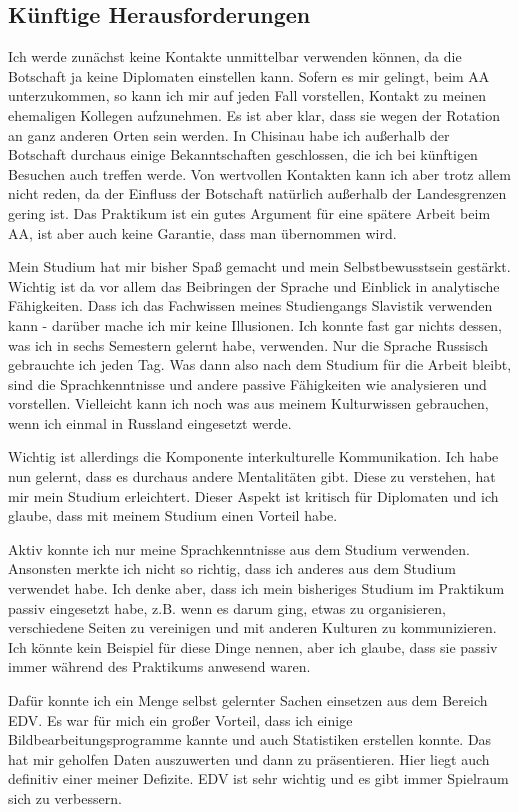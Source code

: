 \documentclass{../../sem_paper}
\begin{document}
\subsection{Künftige Herausforderungen}
Ich werde zunächst keine Kontakte unmittelbar verwenden können, da die Botschaft ja keine Diplomaten einstellen kann. Sofern es mir gelingt, beim AA unterzukommen, so kann ich mir auf jeden Fall vorstellen, Kontakt zu meinen ehemaligen Kollegen aufzunehmen. Es ist aber klar, dass sie wegen der Rotation an ganz anderen Orten sein werden. In Chisinau habe ich außerhalb der Botschaft durchaus einige Bekanntschaften geschlossen, die ich bei künftigen Besuchen auch treffen werde. Von wertvollen Kontakten kann ich aber trotz allem nicht reden, da der Einfluss der Botschaft natürlich außerhalb der Landesgrenzen gering ist. Das Praktikum ist ein gutes Argument für eine spätere Arbeit beim AA, ist aber auch keine Garantie, dass man übernommen wird.

Mein Studium hat mir bisher Spaß gemacht und mein Selbstbewusstsein gestärkt. Wichtig ist da vor allem das Beibringen der Sprache und Einblick in analytische Fähigkeiten. Dass ich das Fachwissen meines Studiengangs Slavistik verwenden kann - darüber mache ich mir keine Illusionen. Ich konnte fast gar nichts dessen, was ich in sechs Semestern gelernt habe, verwenden. Nur die Sprache Russisch gebrauchte ich jeden Tag. Was dann also nach dem Studium für die Arbeit bleibt, sind die Sprachkenntnisse und andere passive Fähigkeiten wie analysieren und vorstellen. Vielleicht kann ich noch was aus meinem Kulturwissen gebrauchen, wenn ich einmal in Russland eingesetzt werde.

Wichtig ist allerdings die Komponente interkulturelle Kommunikation. Ich habe nun gelernt, dass es durchaus andere Mentalitäten gibt. Diese zu verstehen, hat mir mein Studium erleichtert. Dieser Aspekt ist kritisch für Diplomaten und ich glaube, dass mit meinem Studium einen Vorteil habe.

Aktiv konnte ich nur meine Sprachkenntnisse aus dem Studium verwenden. Ansonsten merkte ich nicht so richtig, dass ich anderes aus dem Studium verwendet habe. Ich denke aber, dass ich mein bisheriges Studium im Praktikum passiv eingesetzt habe, z.B. wenn es darum ging, etwas zu organisieren, verschiedene Seiten zu vereinigen und mit anderen Kulturen zu kommunizieren. Ich könnte kein Beispiel für diese Dinge nennen, aber ich glaube, dass sie passiv immer während des Praktikums anwesend waren.

Dafür konnte ich ein Menge selbst gelernter Sachen einsetzen aus dem Bereich EDV. Es war für mich ein großer Vorteil, dass ich einige Bildbearbeitungsprogramme kannte und auch Statistiken erstellen konnte. Das hat mir geholfen Daten auszuwerten und dann zu präsentieren. Hier liegt auch definitiv einer meiner Defizite. EDV ist sehr wichtig und es gibt immer Spielraum sich zu verbessern.
\end{document}
